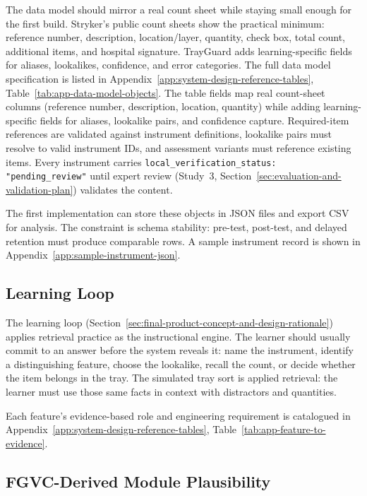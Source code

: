 \documentclass[10pt,a4paper]{article}
\begin{document}
The data model should mirror a real count sheet while staying small enough for
the first build. Stryker's public count sheets show the practical minimum:
reference number, description, location/layer, quantity, check box, total count,
additional items, and hospital signature. TrayGuard adds learning-specific
fields for aliases, lookalikes, confidence, and error categories.
The full data model specification is listed in Appendix~\ref{app:system-design-reference-tables}, Table~\ref{tab:app-data-model-objects}.
The table fields map real count-sheet columns (reference number, description, location, quantity) while adding learning-specific fields for aliases, lookalike pairs, and confidence capture. Required-item references are validated against instrument definitions, lookalike pairs must resolve to valid instrument IDs, and assessment variants must reference existing items. Every instrument carries \texttt{local\_verification\_status: "pending\_review"} until expert review (Study~3, Section~\ref{sec:evaluation-and-validation-plan}) validates the content.

The first implementation can store these objects in JSON files and export CSV
for analysis. The constraint is schema stability: pre-test, post-test,
and delayed retention must produce comparable rows. A sample instrument
record is shown in Appendix~\ref{app:sample-instrument-json}.
\subsection{Learning Loop}


The learning loop (Section~\ref{sec:final-product-concept-and-design-rationale}) applies retrieval practice as the instructional engine. The learner should usually
commit to an answer before the system reveals it: name the instrument, identify
a distinguishing feature, choose the lookalike, recall the count, or decide
whether the item belongs in the tray. The simulated tray sort is applied
retrieval: the learner must use those same facts in context with distractors
and quantities.

Each feature's evidence-based role and engineering requirement is catalogued in Appendix~\ref{app:system-design-reference-tables}, Table~\ref{tab:app-feature-to-evidence}.
\subsection{FGVC-Derived Module Plausibility}
\end{document}
